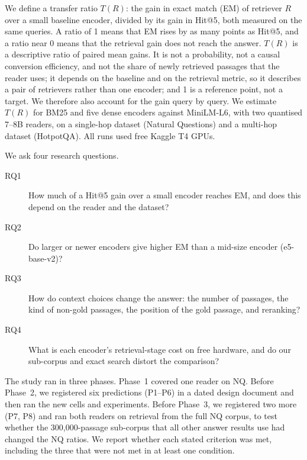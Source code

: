 We define a transfer ratio $T(R)$: the gain in exact match (EM) of retriever $R$ over a small baseline encoder, divided by its gain in Hit@5, both measured on the same queries. A ratio of 1 means that EM rises by as many points as Hit@5, and a ratio near 0 means that the retrieval gain does not reach the answer. $T(R)$ is a descriptive ratio of paired mean gains. It is not a probability, not a causal conversion efficiency, and not the share of newly retrieved passages that the reader uses; it depends on the baseline and on the retrieval metric, so it describes a pair of retrievers rather than one encoder; and 1 is a reference point, not a target. We therefore also account for the gain query by query. We estimate $T(R)$ for BM25 and five dense encoders against MiniLM-L6, with two quantised 7--8B readers, on a single-hop dataset (Natural Questions) and a multi-hop dataset (HotpotQA). All runs used free Kaggle T4 GPUs.

We ask four research questions.
\begin{description}
\item[RQ1] How much of a Hit@5 gain over a small encoder reaches EM, and does this depend on the reader and the dataset?
\item[RQ2] Do larger or newer encoders give higher EM than a mid-size encoder (e5-base-v2)?
\item[RQ3] How do context choices change the answer: the number of passages, the kind of non-gold passages, the position of the gold passage, and reranking?
\item[RQ4] What is each encoder's retrieval-stage cost on free hardware, and do our sub-corpus and exact search distort the comparison?
\end{description}

The study ran in three phases. Phase~1 covered one reader on NQ. Before Phase~2, we registered six predictions (P1--P6) in a dated design document and then ran the new cells and experiments. Before Phase~3, we registered two more (P7, P8) and ran both readers on retrieval from the full NQ corpus, to test whether the 300,000-passage sub-corpus that all other answer results use had changed the NQ ratios. We report whether each stated criterion was met, including the three that were not met in at least one condition.

